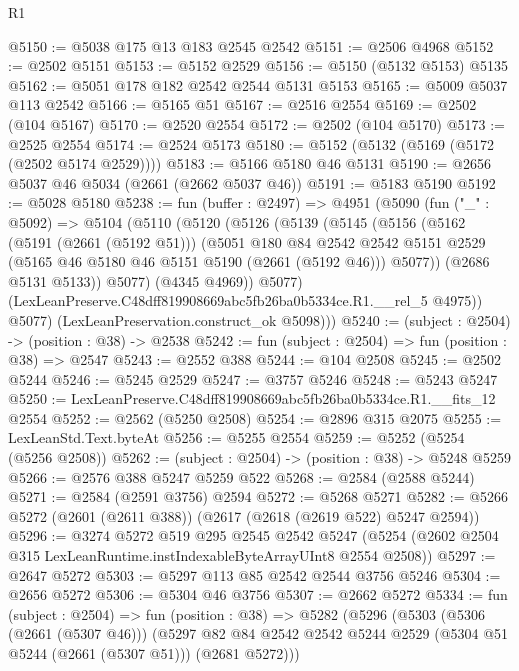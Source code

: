 \begin{lexlean}{R1}
\begin{coremodule}
@5150 := @5038 @175 @13 @183 @2545 @2542
@5151 := @2506 @4968
@5152 := @2502 @5151
@5153 := @5152 @2529
@5156 := @5150 (@5132 @5153) @5135
@5162 := @5051 @178 @182 @2542 @2544 @5131 @5153
@5165 := @5009 @5037 @113 @2542
@5166 := @5165 @51
@5167 := @2516 @2554
@5169 := @2502 (@104 @5167)
@5170 := @2520 @2554
@5172 := @2502 (@104 @5170)
@5173 := @2525 @2554
@5174 := @2524 @5173
@5180 := @5152 (@5132 (@5169 (@5172 (@2502 @5174 @2529))))
@5183 := @5166 @5180 @46 @5131
@5190 := @2656 @5037 @46 @5034 (@2661 (@2662 @5037 @46))
@5191 := @5183 @5190
@5192 := @5028 @5180
@5238 := fun (buffer : @2497) =>
  @4951
    (@5090
      (fun ("_" : @5092) =>
      @5104
        (@5110
          (@5120
            (@5126
              (@5139
                (@5145
                  (@5156
                    (@5162
                      (@5191 (@2661 (@5192 @51)))
                      (@5051
                        @180
                        @84
                        @2542
                        @2542
                        @5151
                        @2529
                        (@5165 @46 @5180 @46 @5151 @5190 (@2661 (@5192 @46)))
                        @5077))
                    (@2686 @5131 @5133))
                  @5077)
                (@4345 @4969))
              @5077)
            (LexLeanPreserve.C48dff819908669abc5fb26ba0b5334ce.R1.__rel_5 @4975))
          @5077)
        (LexLeanPreservation.construct_ok @5098)))
@5240 := (subject : @2504) -> (position : @38) -> @2538
@5242 := fun (subject : @2504) => fun (position : @38) => @2547
@5243 := @2552 @388
@5244 := @104 @2508
@5245 := @2502 @5244
@5246 := @5245 @2529
@5247 := @3757 @5246
@5248 := @5243 @5247
@5250 := LexLeanPreserve.C48dff819908669abc5fb26ba0b5334ce.R1.__fits_12 @2554
@5252 := @2562 (@5250 @2508)
@5254 := @2896 @315 @2075
@5255 := LexLeanStd.Text.byteAt
@5256 := @5255 @2554
@5259 := @5252 (@5254 (@5256 @2508))
@5262 := (subject : @2504) -> (position : @38) -> @5248 @5259
@5266 := @2576 @388 @5247 @5259 @522
@5268 := @2584 (@2588 @5244)
@5271 := @2584 (@2591 @3756) @2594
@5272 := @5268 @5271
@5282 := @5266 @5272 (@2601 (@2611 @388)) (@2617 (@2618 (@2619 @522) @5247 @2594))
@5296 := @3274
    @5272
    @519
    @295
    @2545
    @2542
    @5247
    (@5254 (@2602 @2504 @315 LexLeanRuntime.instIndexableByteArrayUInt8 @2554 @2508))
@5297 := @2647 @5272
@5303 := @5297 @113 @85 @2542 @2544 @3756 @5246
@5304 := @2656 @5272
@5306 := @5304 @46 @3756
@5307 := @2662 @5272
@5334 := fun (subject : @2504) =>
  fun (position : @38) =>
  @5282
    (@5296
      (@5303
        (@5306 (@2661 (@5307 @46)))
        (@5297 @82 @84 @2542 @2542 @5244 @2529 (@5304 @51 @5244 (@2661 (@5307 @51))) (@2681 @5272)))

\end{coremodule}
\end{lexlean}
